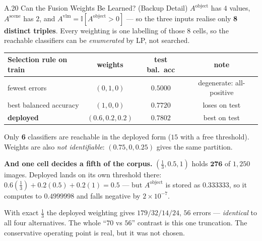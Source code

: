 \documentclass[aspectratio=169,11pt]{beamer}
\begin{document}
\begin{frame}{A.20 Can the Fusion Weights Be Learned? (Backup Detail)}
\scriptsize
$A^{\text{object}}$ has $4$ values, $A^{\text{scene}}$ has $2$, and $A^{\text{vlm}}=\mathbb{I}[A^{\text{object}}>0]$ --- so the three inputs realise only \textbf{8 distinct triples}. Every weighting is one labelling of those 8 cells, so the reachable classifiers can be \emph{enumerated} by LP, not searched.
\vspace{1mm}
\begin{center}
\footnotesize
\begin{tabular}{@{}l c c c@{}}
\toprule
\textbf{Selection rule on train} & \textbf{weights} & \textbf{test bal.\ acc} & \textbf{note} \\
\midrule
fewest errors & $(0,1,0)$ & $0.5000$ & degenerate: all-positive \\
best balanced accuracy & $(1,0,0)$ & $0.7720$ & loses on test \\
\textbf{deployed} & $(0.6,0.2,0.2)$ & $\mathbf{0.7802}$ & best on test \\
\bottomrule
\end{tabular}
\end{center}
Only \textbf{6} classifiers are reachable in the deployed form ($15$ with a free threshold). Weights are also \emph{not identifiable}: $(0.75,0,0.25)$ gives the same partition.
\vspace{2mm}

\textbf{And one cell decides a fifth of the corpus.} $(\tfrac13,0.5,1)$ holds $\mathbf{276}$ of $1{,}250$ images. Deployed lands on its own threshold there: $0.6(\tfrac13)+0.2(0.5)+0.2(1)=0.5$ --- but $A^{\text{object}}$ is stored as $0.333333$, so it computes to $\mathbf{0.4999998}$ and falls negative by $2\times10^{-7}$.
\vspace{1mm}

With exact $\tfrac13$ the deployed weighting gives $179/32/14/24$, $56$ errors --- \emph{identical} to all four alternatives. The whole ``$70$ vs $56$'' contrast is this one truncation. The conservative operating point is real, but it was not chosen.
\end{frame}
\end{document}
